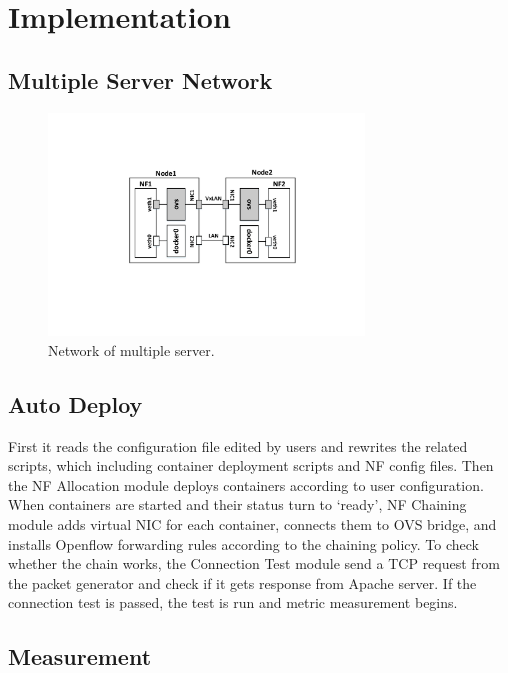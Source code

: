 \section{Implementation}
\subsection{Multiple Server Network}
\begin{figure}[!t]
\centering
\includegraphics[width=3.3in]{fig/network.pdf}
\caption{Network of multiple server.}
\label{design}
\end{figure}



\subsection{Auto Deploy}
First it reads the configuration file edited by users and rewrites the related scripts,
which including container deployment scripts and NF config files.
Then the NF Allocation module deploys containers according to user configuration.
When containers are started and their status turn to `ready',
NF Chaining module adds virtual NIC for each container,
connects them to OVS bridge,
and installs Openflow forwarding rules according to the chaining policy.
To check whether the chain works,
the Connection Test module send a TCP request
from the packet generator and check if it gets response from Apache server.
If the connection test is passed,
the test is run and metric measurement begins.
\subsection{Measurement}

